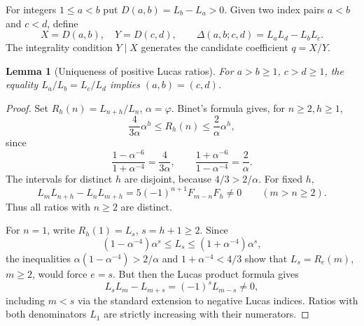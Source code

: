 \documentclass[11pt]{article}
\newtheorem{lemma}[theorem]{Lemma}
\begin{document}
For integers \(1\le a<b\) put \(D(a,b)=L_b-L_a>0\).
Given two index pairs \(a<b\) and \(c<d\), define
\[
X=D(a,b),\quad Y=D(c,d),\qquad
\Delta(a,b;c,d)=L_aL_d-L_bL_c.
\]
The integrality condition \(Y\mid X\) generates
the candidate coefficient \(q=X/Y\).

\begin{lemma}[Uniqueness of positive Lucas ratios]
\label{lem:lucas-ratio}
For \(a>b\ge1\), \(c>d\ge1\), the equality
\(L_a/L_b=L_c/L_d\) implies \((a,b)=(c,d)\).
\end{lemma}
\begin{proof}
Set \(R_h(n)=L_{n+h}/L_n\), \(\alpha=\varphi\).
Binet's formula gives, for \(n\ge2,h\ge1\),
\begin{equation}\label{eq:ratio-interval}
\frac4{3\alpha}\alpha^h
\le R_h(n)\le \frac2\alpha\alpha^h,
\end{equation}
since
\[
\frac{1-\alpha^{-6}}{1+\alpha^{-4}}
=\frac4{3\alpha},\qquad
\frac{1+\alpha^{-6}}{1-\alpha^{-4}}
=\frac2\alpha.
\]
The intervals for distinct \(h\) are disjoint,
because \(4/3>2/\alpha\). For fixed \(h\),
\[
L_mL_{n+h}-L_nL_{m+h}
=5(-1)^{n+1}F_{m-n}F_h\ne0
\qquad(m>n\ge2).
\]
Thus all ratios with \(n\ge2\) are distinct.

For \(n=1\), write \(R_h(1)=L_s\),
\(s=h+1\ge2\). Since
\[
(1-\alpha^{-4})\alpha^s
\le L_s\le(1+\alpha^{-4})\alpha^s,
\]
the inequalities
\(\alpha(1-\alpha^{-4})>2/\alpha\)
and \(1+\alpha^{-4}<4/3\) show that
\(L_s=R_e(m)\), \(m\ge2\), would force \(e=s\).
But then the Lucas product formula gives
\[
L_sL_m-L_{m+s}=(-1)^sL_{m-s}\ne0,
\]
including \(m<s\) via the standard extension
to negative Lucas indices.
Ratios with both denominators \(L_1\)
are strictly increasing with their numerators.
\end{proof}
\end{document}
